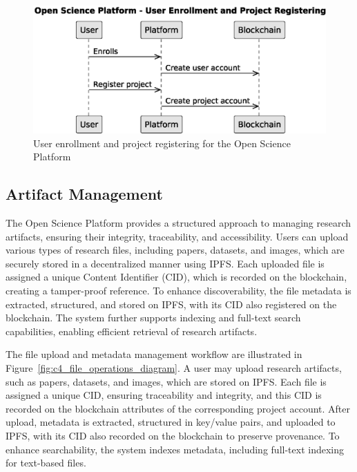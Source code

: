 \documentclass[final]{rc-book-2.14}
\begin{document}
\begin{figure}[htbp]
    \centering
    \includegraphics[scale=0.5]{fig/c4_platform_operations_1.eps}
    \caption{User enrollment and project registering for the Open Science Platform}
    \label{fig:c4_operations_1}
\end{figure}

\subsection{Artifact Management}

The Open Science Platform provides a structured approach to managing research artifacts, ensuring their integrity, traceability, and accessibility. Users can upload various types of research files, including papers, datasets, and images, which are securely stored in a decentralized manner using IPFS. Each uploaded file is assigned a unique Content Identifier (CID), which is recorded on the blockchain, creating a tamper-proof reference. To enhance discoverability, the file metadata is extracted, structured, and stored on IPFS, with its CID also registered on the blockchain. The system further supports indexing and full-text search capabilities, enabling efficient retrieval of research artifacts.

The file upload and metadata management workflow are illustrated in Figure~\ref{fig:c4_file_operations_diagram}. A user may upload research artifacts, such as papers, datasets, and images, which are stored on IPFS. Each file is assigned a unique CID, ensuring traceability and integrity, and this CID is recorded on the blockchain attributes of the corresponding project account. After upload, metadata is extracted, structured in key/value pairs, and uploaded to IPFS, with its CID also recorded on the blockchain to preserve provenance. To enhance searchability, the system indexes metadata, including full-text indexing for text-based files.
\end{document}
